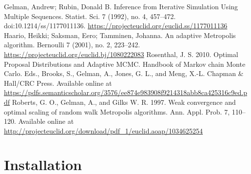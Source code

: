 \documentclass[12pt,preprint]{aastex}
\newcommand{\project}[1]{{\sffamily #1}}
\newcommand{\Python}{\project{Python}}
\newcommand{\numpy}{\project{numpy}}
\newcommand{\pip}{\project{pip}}
\newcommand{\thisplain}{pipeline}
\newcommand{\this}{\project{\thisplain}}
\newcommand{\sectlabel}[1]{\label{sect:#1}}
\begin{document}

\begin{thebibliography}{}\raggedright
{}
    Gelman, Andrew; Rubin, Donald B. Inference from Iterative Simulation Using Multiple Sequences. Statist. Sci. 7 (1992), no. 4, 457--472. doi:10.1214/ss/1177011136. \url{https://projecteuclid.org/euclid.ss/1177011136}
    Haario, Heikki; Saksman, Eero; Tamminen, Johanna. An adaptive Metropolis algorithm. Bernoulli 7 (2001), no. 2, 223--242. \url{https://projecteuclid.org/euclid.bj/1080222083}
    Rosenthal, J. S. 2010. Optimal Proposal Distributions and Adaptive MCMC. Handbook of Markov chain Monte Carlo. Eds., Brooks, S., Gelman, A., Jones, G. L., and Meng, X.-L. Chapman \& Hall/CRC Press. Available online at \url{https://pdfs.semanticscholar.org/3576/ee874e983908f9214318abb8ca425316c9ed.pdf}
    Roberts, G. O., Gelman, A., and Gilks W. R. 1997. Weak convergence and optimal scaling of random walk Metropolis algorithms. Ann. Appl. Prob. 7, 110–120. Available online at \url{http://projecteuclid.org/download/pdf_1/euclid.aoap/1034625254}

\end{thebibliography}

\clearpage
\appendix
\section{Installation}\sectlabel{install}

\end{document}
